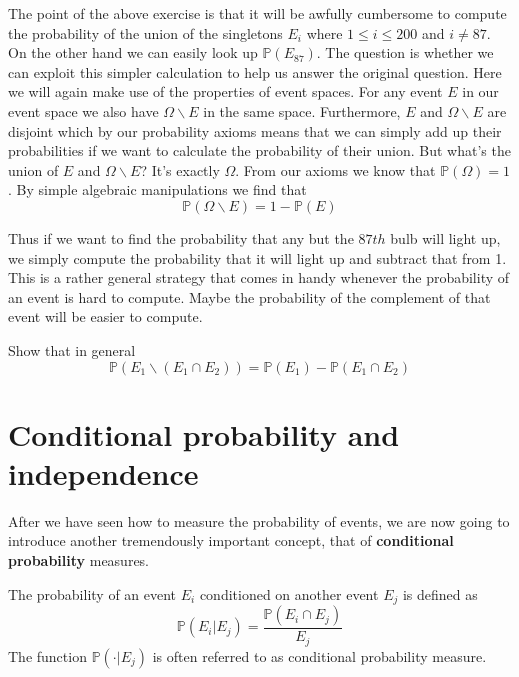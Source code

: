 \documentclass[a4paper,11pt,leqno]{report}
\begin{document}
The point of the above exercise is that it will be awfully cumbersome to compute the probability of the
union of the singletons $ {E_{i}} $ where $ 1 \leq i \leq 200 $ and $ i \not = 87 $. On the other hand
we can easily look up $ \mathbb{P}(E_{87}) $. The question is whether we can exploit this simpler calculation
to help us answer the original question. Here we will again make use of the properties of event spaces.
For any event $ E $ in our event space we also have $ \Omega \backslash E $ in the same space. Furthermore,
$ E $ and $ \Omega \backslash E $ are disjoint which by our probability axioms means that we can simply add
up their probabilities if we want to calculate the probability of their union. But what's the union
of $ E $ and $ \Omega \backslash E $? It's exactly $ \Omega $. From our axioms we know that 
$ \mathbb{P}(\Omega) = 1 $. By simple algebraic manipulations we find that 
\begin{equation}
\mathbb{P}(\Omega \backslash E) = 1 - \mathbb{P}(E)
\end{equation}

Thus if we want to find the probability that any but the $ 87th $ bulb will light up, we simply compute
the probability that it will light up and subtract that from 1. This is a rather general strategy that
comes in handy whenever the probability of an event is hard to compute. Maybe the probability of the
complement of that event will be easier to compute.

\begin{Exercise}
Show that in general $$ \mathbb{P}(E_{1}\backslash (E_{1}\cap E_{2})) 
= \mathbb{P}(E_{1}) - \mathbb{P}(E_{1}\cap E_{2}) $$
\end{Exercise}

\section{Conditional probability and independence}
After we have seen how to measure the probability of events, we are now going to introduce another
tremendously important concept, that of \textbf{conditional probability} measures.

\begin{Definition}{}
The probability of an event $ E_{i} $ conditioned on another event $ E_{j} $ is defined as
$$ \mathbb{P}(E_{i}|E_{j}) = \dfrac{\mathbb{P}(E_{i} \cap E_{j})}{E_{j}} $$
The function $ \mathbb{P}(\cdot|E_{j}) $ is often referred to as conditional probability measure.
\end{Definition}
\end{document}

